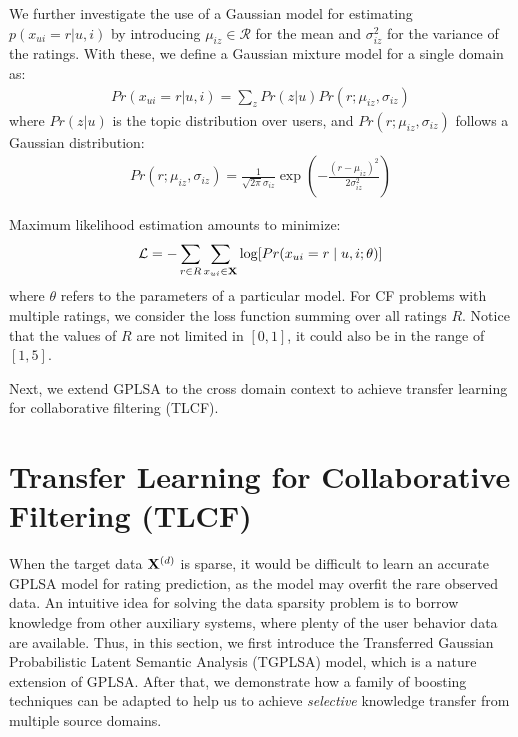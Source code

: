 We further investigate the use of a Gaussian model for estimating $p(x_{ui} = r | u, i)$ by introducing $\mu_{iz} \in \mathcal{R}$ for the mean and $\sigma_{iz}^2$ for the variance of the ratings. With these, we define a Gaussian mixture model for a single domain as:
\begin{eqnarray}
\nonumber
Pr(x_{ui} = r | u, i) = \sum_{z} Pr(z | u) Pr(r; \mu_{iz}, \sigma_{iz})
\end{eqnarray}
where $Pr(z |u)$ is the topic distribution over users, and $Pr(r; \mu_{iz}, \sigma_{iz})$ follows a Gaussian distribution:
\begin{eqnarray}
\nonumber
Pr(r; \mu_{iz}, \sigma_{iz}) = \frac{1}{\sqrt{2 \pi} \sigma_{iz}} \exp{(-\frac{(r-\mu_{iz})^2}{2 \sigma_{iz}^2})}
\end{eqnarray}

Maximum likelihood estimation amounts to minimize:
\begin{eqnarray}\label{eq:likelihood}
\mathcal{L} = -  \sum_{r \in R} \sum_{x_{ui} \in \mathbf{X}} \log [ Pr(x_{ui} = r \mid u,i ; \theta) ]
\end{eqnarray}
where $\theta$ refers to the parameters of a particular model.
For CF problems with multiple ratings, we consider the loss function summing over all ratings $R$. Notice that the values of $R$ are not limited in $[0,1]$, it could also be in the range of $[1,5]$.

Next, we extend GPLSA to the cross domain context to achieve transfer learning for collaborative filtering (TLCF).

\hspace{0.1in}
\section{Transfer Learning for Collaborative Filtering (TLCF)}

When the target data $\mathbf{X}^{(d)}$ is sparse, it would be difficult to learn an accurate GPLSA model for rating prediction, as the model may overfit the rare observed data. An intuitive idea for solving the data sparsity problem is to borrow knowledge from other auxiliary systems, where plenty of the user behavior data are available. Thus, in this section, we first introduce the Transferred Gaussian Probabilistic Latent Semantic Analysis (TGPLSA) model, which is a nature extension of GPLSA. After that, we demonstrate how a family of boosting techniques can be adapted to help us to achieve \emph{selective} knowledge transfer from multiple source domains.

